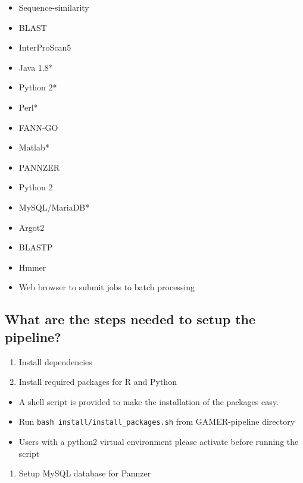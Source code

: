 \documentclass[11pt,letterpaper]{article}
\begin{document}
\begin{itemize}
 \item
       Sequence-similarity
 \item
       BLAST
 \item
       InterProScan5
 \item
       Java 1.8*
 \item
       Python 2*
 \item
       Perl*
 \item
       FANN-GO
 \item
       Matlab*
 \item
       PANNZER
 \item
       Python 2
 \item
       MySQL/MariaDB*
 \item
       Argot2
 \item
       BLASTP
 \item
       Hmmer
 \item
       Web browser to submit jobs to batch processing
\end{itemize}



\subsection{What are the steps needed to setup the pipeline?}\label{what-are-the-steps-needed-to-setup-the-pipeline}

\begin{enumerate}
 \def\labelenumi{\arabic{enumi}.}

 \item
       Install dependencies
 \item
       Install required packages for R and Python
\end{enumerate}

\begin{itemize}

 \item
       A shell script is provided to make the installation of the packages
       easy.
 \item
       Run \texttt{bash\ install/install\_packages.sh} from GAMER-pipeline
       directory
 \item
       Users with a python2 virtual environment please activate before
       running the script
\end{itemize}

\begin{enumerate}
 \def\labelenumi{\arabic{enumi}.}
 \setcounter{enumi}{2}

 \item
       Setup MySQL database for Pannzer
\end{enumerate}
\end{document}
